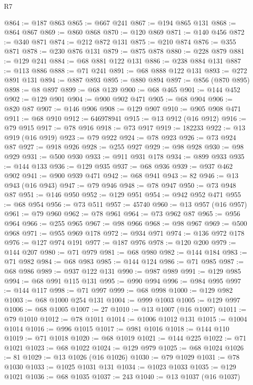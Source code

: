 \begin{lexlean}{R7}
\begin{coremodule}
@864 := @187 @863
@865 := @667 @241
@867 := @194 @865 @131
@868 := @864 @867
@869 := @860 @868
@870 := @120 @869
@871 := @140 @456
@872 := @340 @871
@874 := @212 @872 @131
@875 := @210 @874
@876 := @355 @871
@878 := @230 @876 @131
@879 := @875 @878
@880 := @228 @879
@881 := @129 @241
@884 := @68 @881 @122 @131
@886 := @238 @884 @131
@887 := @113 @886
@888 := @71 @241
@891 := @68 @888 @122 @131
@893 := @272 @891 @131
@894 := @887 @893
@895 := @880 @894
@897 := @856 (@870 @895)
@898 := @8 @897
@899 := @68 @139
@900 := @68 @465
@901 := @144 @452
@902 := @129 @901
@904 := @900 @902 @471
@905 := @68 @904
@906 := @820 @87
@907 := @146 @906
@908 := @129 @907
@910 := @905 @908 @471
@911 := @68 @910
@912 := 646978941
@915 := @13 @912 (@16 @912)
@916 := @79 @915
@917 := @78 @916
@918 := @73 @917
@919 := 182233
@922 := @13 @919 (@16 @919)
@923 := @79 @922
@924 := @78 @923
@926 := @73 @924 @87
@927 := @918 @926
@928 := @255 @927
@929 := @98 @928
@930 := @98 @929
@931 := @500 @930
@933 := @911 @931 @178
@934 := @899 @933
@935 := @144 @133
@936 := @129 @935
@937 := @68 @936
@939 := @937 @462 @902
@941 := @900 @939 @471
@942 := @68 @941
@943 := 82
@946 := @13 @943 (@16 @943)
@947 := @79 @946
@948 := @78 @947
@950 := @73 @948 @87
@951 := @146 @950
@952 := @129 @951
@954 := @942 @952 @471
@955 := @68 @954
@956 := @73 @511
@957 := 45740
@960 := @13 @957 (@16 @957)
@961 := @79 @960
@962 := @78 @961
@964 := @73 @962 @87
@965 := @956 @964
@966 := @255 @965
@967 := @98 @966
@968 := @98 @967
@969 := @500 @968
@971 := @955 @969 @178
@972 := @934 @971
@974 := @136 @972 @178
@976 := @127 @974 @191
@977 := @187 @976
@978 := @120 @200
@979 := @144 @207
@980 := @71 @979
@981 := @68 @980
@982 := @144 @184
@983 := @71 @982
@984 := @68 @983
@985 := @144 @124
@986 := @71 @985
@987 := @68 @986
@989 := @937 @122 @131
@990 := @987 @989
@991 := @129 @985
@994 := @68 @991 @115 @131
@995 := @990 @994
@996 := @984 @995
@997 := @144 @117
@998 := @71 @997
@999 := @68 @998
@1000 := @129 @982
@1003 := @68 @1000 @254 @131
@1004 := @999 @1003
@1005 := @129 @997
@1006 := @68 @1005
@1007 := 27
@1010 := @13 @1007 (@16 @1007)
@1011 := @79 @1010
@1012 := @78 @1011
@1014 := @1006 @1012 @131
@1015 := @1004 @1014
@1016 := @996 @1015
@1017 := @981 @1016
@1018 := @144 @110
@1019 := @71 @1018
@1020 := @68 @1019
@1021 := @144 @225
@1022 := @71 @1021
@1023 := @68 @1022
@1024 := @129 @979
@1025 := @68 @1024
@1026 := 81
@1029 := @13 @1026 (@16 @1026)
@1030 := @79 @1029
@1031 := @78 @1030
@1033 := @1025 @1031 @131
@1034 := @1023 @1033
@1035 := @129 @1021
@1036 := @68 @1035
@1037 := 243
@1040 := @13 @1037 (@16 @1037)

\end{coremodule}
\end{lexlean}
